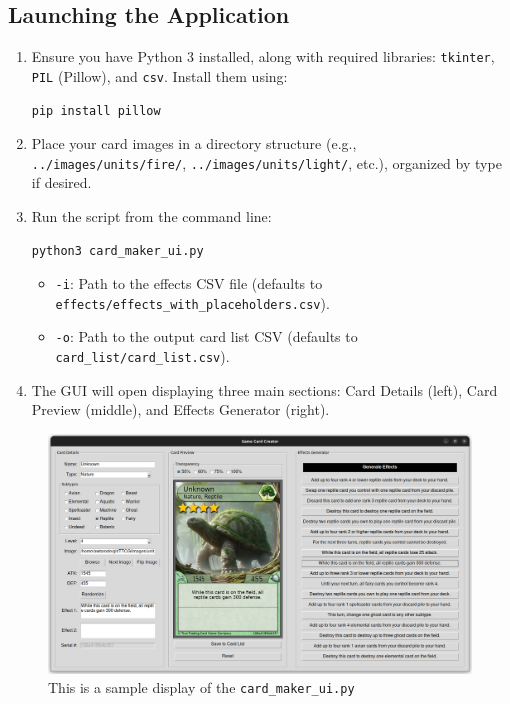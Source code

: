 \subsection{Launching the Application}

\begin{enumerate}
    \item Ensure you have Python 3 installed, along with required libraries: \texttt{tkinter}, \texttt{PIL} (Pillow), and \texttt{csv}. Install them using:
\begin{lstlisting}[style=terminalstyle]
pip install pillow
\end{lstlisting}
    \item Place your card images in a directory structure (e.g., \texttt{../images/units/fire/}, \texttt{../images/units/light/}, etc.), organized by type if desired.
    \item Run the script from the command line:
\begin{lstlisting}[style=terminalstyle]
python3 card_maker_ui.py
\end{lstlisting}
          \begin{itemize}
              \item \texttt{-i}: Path to the effects CSV file (defaults to \texttt{effects/effects\_with\_placeholders.csv}).
              \item \texttt{-o}: Path to the output card list CSV (defaults to \texttt{card\_list/card\_list.csv}).
          \end{itemize}
    \item The GUI will open displaying three main sections: Card Details (left), Card Preview (middle), and Effects Generator (right).
\end{enumerate}

\begin{figure}[h]
	\centering
	\includegraphics[width=\textwidth]{images/ui_sample.png} 
	\caption{This is a sample display of the \texttt{card\_maker\_ui.py}}
	\label{fig:sample_ui_window}
\end{figure}


